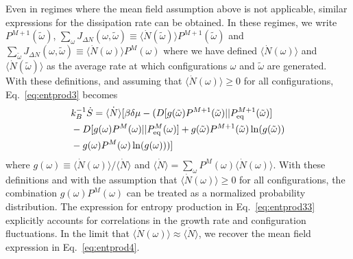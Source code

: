 \documentclass[amsmath,preprintnumbers,10pt,nofootinbib,prl,twocolumn]{revtex4-1}
\begin{document}
Even in regimes where the mean field assumption above is not applicable, similar expressions for the dissipation rate can be obtained. In these regimes, we write $P^{M+1}(\tilde \omega)$, $\sum_{\omega} J_{\Delta N}(\omega,\tilde\omega)\equiv \langle \dot{N}(\tilde \omega)\rangle P^{M+1}(\tilde \omega)$ and $\sum_{\tilde\omega} J_{\Delta N}(\omega,\tilde\omega)\equiv \langle \dot{N} (\omega)\rangle P^M(\omega)$ where we have defined $\langle \dot{N}(\omega) \rangle$ and  $\langle \dot{N} ({\tilde \omega}) \rangle$ as the average rate at which configurations $\omega$ and $\tilde \omega$ are generated. With these definitions, and assuming that $\langle\dot{N}(\omega)\rangle\geq 0$ for all configurations, Eq.~\ref{eq:entprod3} becomes 
\begin{equation}
\label{eq:entprod33}
\begin{split}
    &k_B^{-1}\dot{S}=\dot{\langle N\rangle}\lbrack\beta\delta\mu -(D[g(\tilde\omega)
    P^{M+1}(\tilde \omega)|| P_{\rm eq}^{M+1}(\tilde \omega)]\\
    &-D[g(\omega)P^{M}(\omega)|| P_{\rm eq}^{M}(\omega)]+g(\tilde\omega)
    P^{M+1}(\tilde \omega)\ln(g(\tilde\omega))\\
    &-g(\omega)P^{M}(\omega)\ln(g(\omega)))\rbrack
\end{split}
\end{equation}
where $g(\omega)\equiv \langle \dot{N}(\omega) \rangle/\langle\dot{N}\rangle$ and $\langle\dot{N}\rangle=\sum_\omega P^M(\omega) \langle\dot{N}(\omega)\rangle$. With these definitions and with the assumption that $\langle\dot{N}(\omega)\rangle\geq 0$ for all configurations, the combination $g(\omega)P^{M}(\omega)$ can be treated as a normalized probability distribution. The expression for entropy production in Eq.~\ref{eq:entprod33} explicitly accounts for correlations in the growth rate and configuration fluctuations. In the limit that $\langle \dot{N} (\omega)\rangle \approx \langle \dot{N}\rangle$, we recover the mean field expression in Eq.~\ref{eq:entprod4}. 
\end{document}

